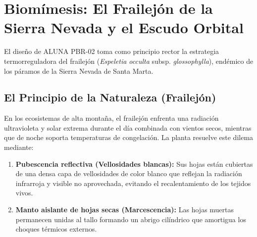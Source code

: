 \documentclass[11pt,letterpaper]{article}
\begin{document}
\section{Biomímesis: El Frailejón de la Sierra Nevada y el Escudo Orbital}

El diseño de ALUNA PBR-02 toma como principio rector la estrategia termorreguladora del frailejón (\textit{Espeletia occulta} subsp. \textit{glossophylla}), endémico de los páramos de la Sierra Nevada de Santa Marta.

\subsection{El Principio de la Naturaleza (Frailejón)}
En los ecosistemas de alta montaña, el frailejón enfrenta una radiación ultravioleta y solar extrema durante el día combinada con vientos secos, mientras que de noche soporta temperaturas de congelación. La planta resuelve este dilema mediante:
\begin{enumerate}
    \item \textbf{Pubescencia reflectiva (Vellosidades blancas):} Sus hojas están cubiertas de una densa capa de vellosidades de color blanco que reflejan la radiación infrarroja y visible no aprovechada, evitando el recalentamiento de los tejidos vivos.
    \item \textbf{Manto aislante de hojas secas (Marcescencia):} Las hojas muertas permanecen unidas al tallo formando un abrigo cilíndrico que amortigua los choques térmicos externos.
\end{enumerate}
\end{document}
